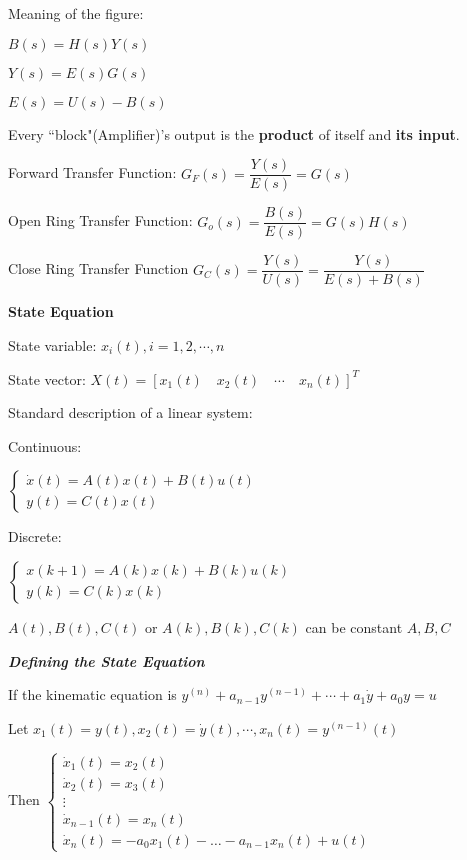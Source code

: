 \documentclass{article}
\newcommand{\bigtitle}[1]{
	\noindent
	\textbf{#1}
}
\newcommand{\smalltitle}[1]{
	\noindent
	\textbf{\textit{#1}}
}
\begin{document}
\begin{spacing}{1.2}
\begin{center}
\end{center}

Meaning of the figure:

$B(s)=H(s)Y(s)$

$Y(s)=E(s)G(s)$

$E(s)=U(s)-B(s)$

Every ``block"(Amplifier)'s output is the \textbf{product} of itself and \textbf{its input}.


Forward Transfer Function: $G_{F}(s)=\dfrac{Y(s)}{E(s)}=G(s)$

Open Ring Transfer Function: $G_{o}(s)=\dfrac{B(s)}{E(s)}=G(s) H(s)$

Close Ring Transfer Function $G_{C}(s)=\dfrac{Y(s)}{U(s)}=\dfrac{Y(s)}{E(s)+B(s)}$


\bigtitle{State Equation}

State variable: $x_i(t), i=1,2,\cdots,n$

State vector: $X(t)=\left[x_{1}(t) \quad x_{2}(t) \quad \cdots \quad x_{n}(t)\right]^{T}$


Standard description of a linear system:

Continuous:

$
\left\{
\begin{array}{l}
\dot{x}(t)=A(t) x(t)+B(t) u(t)\\
y(t)=C(t) x(t)
\end{array}
\right.
$

Discrete:

$
\left\{\begin{array}{l}{x(k+1)=A(k) x(k)+B(k) u(k)} \\ {y(k)=C(k) x(k)}\end{array}\right.
$

$A(t), B(t), C(t)$ or $A(k), B(k), C(k)$ can be constant $A,B,C$


\smalltitle{Defining the State Equation}

If the kinematic equation is $y^{(n)}+a_{n-1} y^{(n-1)}+\cdots+a_{1} \dot{y}+a_{0} y=u$

Let $x_{1}(t)=y(t), x_{2}(t)=\dot{y}(t), \cdots, x_{n}(t)=y^{(n-1)}(t)$

Then $
\left\{\begin{array}{l}{\dot{x}_{1}(t)=x_{2}(t)} \\ {\dot{x}_{2}(t)=x_{3}(t)} \\ {\vdots} \\ {\dot{x}_{n-1}(t)=x_{n}(t)} \\ {\dot{x}_{n}(t)=-a_{0} x_{1}(t) - \ldots -a_{n-1}x_{n}(t)+u(t)}\end{array}\right.
$


\end{spacing}
\end{document}
